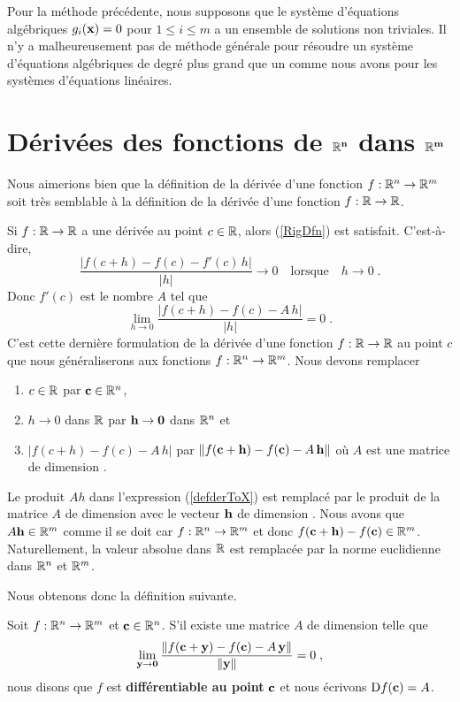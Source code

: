 {Pour la méthode précédente, nous supposons que le système d'équations
algébriques $g_i(\mathbf{x}) =0$ pour $1 \leq i \leq m$ a un ensemble de
solutions non triviales.  Il n'y a malheureusement pas de méthode
générale pour résoudre un système d'équations algébriques de degré
plus grand que un comme nous avons pour les systèmes d'équations linéaires.

\section{Dérivées des fonctions de $\mathbf{\mathbb{R}^n}$ dans
  $\mathbf{\mathbb{R}^m}$ \theory \life}

Nous aimerions bien que la définition de la dérivée d'une fonction
$f:\mathbb{R}^n\rightarrow \mathbb{R}^m$ soit très semblable à la définition de la dérivée
d'une fonction $f:\mathbb{R}\rightarrow \mathbb{R}$.

Si $f:\mathbb{R}\rightarrow \mathbb{R}$ a une dérivée au point $c\in \mathbb{R}$, alors
(\ref{RigDfn}) est satisfait.  C'est-à-dire,
\[
\frac{|f(c+h)-f(c)-f'(c)\,h|}{|h|} \rightarrow 0 \quad \text{lorsque} \quad
h\rightarrow 0 \; .
\]
Donc $f'(c)$ est le nombre $A$ tel que
\begin{equation}\label{defderToX}
\lim_{h\rightarrow 0} \frac{|f(c+h)-f(c)-A\,h|}{|h|} = 0 \; .
\end{equation}
C'est cette dernière formulation de la dérivée d'une fonction
$f:\mathbb{R}\rightarrow \mathbb{R}$ au point $c$ que nous généraliserons aux fonctions
$f:\mathbb{R}^n\rightarrow \mathbb{R}^m$.  Nous devons remplacer
\begin{enumerate}
\item $c\in \mathbb{R}$ par $\mathbf{c} \in \mathbb{R}^n$,
\item $h\rightarrow 0$ dans $\mathbb{R}$ par $\mathbf{h} \rightarrow \mathbf{0}$
dans $\mathbb{R}^n$ et
\item $|f(c+h)-f(c)-A\,h|$ par
$\|f(\mathbf{c}+\mathbf{h})-f(\mathbf{c})-A\,\mathbf{h}\|$ où $A$ est une matrice
de dimension .
\end{enumerate}
Le produit $Ah$ dans l'expression (\ref{defderToX}) est remplacé
par le produit de la matrice $A$ de dimension  avec le
vecteur $\mathbf{h}$ de dimension .
Nous avons que $A \mathbf{h} \in \mathbb{R}^m$
comme il se doit car $f:\mathbb{R}^n \to \mathbb{R}^m$ et donc 
$f(\mathbf{c}+\mathbf{h})-f(\mathbf{c}) \in \mathbb{R}^m$.  Naturellement, la valeur
absolue dans $\mathbb{R}$ est remplacée par la norme euclidienne dans $\mathbb{R}^n$
et $\mathbb{R}^m$.

Nous obtenons donc la définition suivante.

\begin{defn} 
Soit $f:\mathbb{R}^n\rightarrow \mathbb{R}^m$ et $\mathbf{c} \in \mathbb{R}^n$.  S'il existe
une matrice $A$ de dimension  telle que
\begin{equation}\label{defderRNRM}
\lim_{\mathbf{y}\rightarrow \mathbf{0}}
\frac{\|f(\mathbf{c}+\mathbf{y})-f(\mathbf{c})- A\,\mathbf{y}\|}{\|\mathbf{y}\|} = 0\; ,
\end{equation}
nous disons que $f$ est {\bfseries différentiable au point} $\mathbf{c}$ et
nous écrivons $\mathrm{D} f(\mathbf{c}) = A$.
\end{defn}

}
